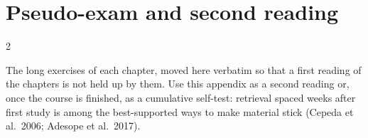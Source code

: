 \chapter{Pseudo-exam and second reading}\label{app:exam}
\begin{paracol}{2}

The long exercises of each chapter, moved here verbatim so that a first reading of the chapters is not held
up by them. Use this appendix as a second reading or, once the course is finished, as a cumulative
self-test: retrieval spaced weeks after first study is among the best-supported ways to make material stick
(Cepeda et al.\ 2006; Adesope et al.\ 2017).

\flushside
\end{paracol}
